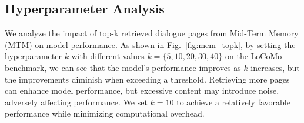 \documentclass[11pt]{article}
\begin{document}


\subsection{Hyperparameter Analysis}
We analyze the impact of top-k retrieved dialogue pages from Mid-Term Memory (MTM) on model performance.
As shown in Fig.~\ref{fig:mem_topk}, by setting the hyperparameter $k$ with different values $k=\{5,10,20,30,40\}$ on the LoCoMo benchmark, we can see that
the model's performance improves as $k$ increases, but the improvements diminish when exceeding a threshold. Retrieving more pages can enhance model performance, but excessive content may introduce noise, adversely affecting performance. We set $k=10$ to achieve a relatively favorable performance while minimizing computational overhead.



\end{document}
